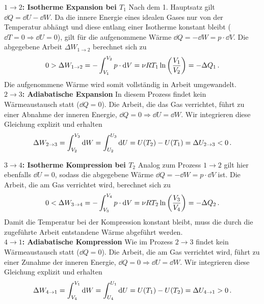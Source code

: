 \textbf{$1\rightarrow 2$: Isotherme Expansion bei $T_1$}\newline
Nach dem 1. Hauptsatz gilt $\dd Q = \dd U - \dd W$. Da die innere Energie eines idealen Gases nur von der Temperatur abhängt und diese entlang einer Isotherme konstant bleibt ($\dd T = 0 \Rightarrow \dd U=0$), gilt für die aufgenommene Wärme $\dd Q = -\dd W = p \cdot \dd V$. Die abgegebene Arbeit $\Delta W_{1\to 2}$ berechnet sich zu
\begin{equation}
    0 > \Delta W_{1\to 2} = -\int_{V_1}^{V_2} p \cdot \mathrm{d} V = \nu R T_1 \ln\left(\frac{V_1}{V_2}\right) = -\Delta Q_1\,.
\end{equation}
Die aufgenommene Wärme wird somit vollständig in Arbeit umgewandelt. \\

\textbf{$2\rightarrow 3$: Adiabatische Expansion}\newline
In diesem Prozess findet kein Wärmeaustausch statt ($\dd Q=0$). Die Arbeit, die das Gas verrichtet, führt zu einer Abnahme der inneren Energie, $\dd Q = 0 \Rightarrow \dd U = \dd W$. Wir integrieren diese Gleichung explizit und erhalten 
\begin{equation}
    \Delta W_{2\to 3} = \int_{V_2}^{V_3} \mathrm{d} W = \int_{U_2}^{U_3} \mathrm{d} U = U(T_2) - U(T_1) = \Delta U_{2\to 3} < 0 \,.
\end{equation}

\textbf{$3\rightarrow 4$: Isotherme Kompression bei $T_2$}\newline
Analog zum Prozess $1\to 2$ gilt hier ebenfalls $\dd U=0$, sodass die abgegebene Wärme $\dd Q = -\dd W = p \cdot \dd V$ ist. Die Arbeit, die am Gas verrichtet wird, berechnet sich zu
\begin{equation}
    0 < \Delta W_{3\to 4} = -\int_{V_3}^{V_4} p \cdot \mathrm{d} V = \nu R T_2 \ln\left(\frac{V_3}{V_4}\right) = -\Delta Q_2 \,.
\end{equation}
Damit die Temperatur bei der Kompression konstant bleibt, muss die durch die zugeführte Arbeit entstandene Wärme abgeführt werden. \\

\textbf{$4\rightarrow 1$: Adiabatische Kompression}\newline
Wie im Prozess $2\to 3$ findet kein Wärmeaustausch statt ($\dd Q=0$). Die Arbeit, die am Gas verrichtet wird, führt zu einer Zunahme der inneren Energie, $\dd Q = 0 \Rightarrow \dd U = \dd W$. Wir integrieren diese Gleichung explizit und erhalten
\begin{equation}    
    \Delta W_{4\to 1} = \int_{V_4}^{V_1} \mathrm{d} W = \int_{U_4}^{U_1} \mathrm{d} U = U(T_1) - U(T_2) = \Delta U_{4\to 1} > 0 \,.
\end{equation}

